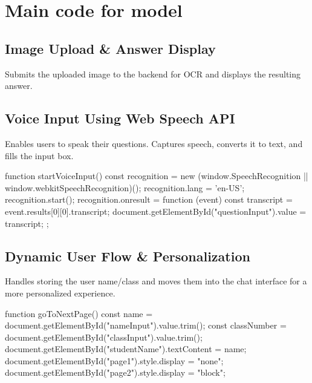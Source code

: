 \documentclass{josis}
\begin{document}
 
\section{  Main code for model}
\subsection{Image Upload \& Answer Display  }
Submits the uploaded image to the backend for OCR and displays the resulting answer.

 
\subsection{Voice Input Using Web Speech API  }
Enables users to speak their questions. Captures speech, converts it to text, and fills the input box.

 
\begin{python}
function startVoiceInput() {
  const recognition = new (window.SpeechRecognition || window.webkitSpeechRecognition)();
  recognition.lang = 'en-US';
  recognition.start();
  recognition.onresult = function (event) {
    const transcript = event.results[0][0].transcript;
    document.getElementById("questionInput").value = transcript;
  };
}

\end{python}
  

\subsection{Dynamic User Flow \& Personalization }
Handles storing the user name/class and moves them into the chat interface for a more personalized experience.

 
\begin{python}
function goToNextPage() {
  const name = document.getElementById("nameInput").value.trim();
  const classNumber = document.getElementById("classInput").value.trim();
  document.getElementById("studentName").textContent = name;
  document.getElementById("page1").style.display = "none";
  document.getElementById("page2").style.display = "block";
}

\end{python}
\end{document}
